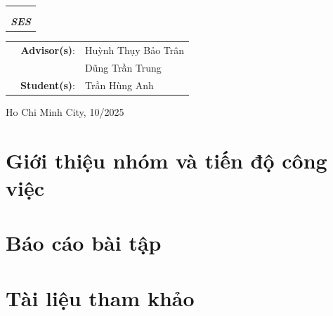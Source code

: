 \documentclass[a4paper]{article}
\begin{document}
\begin{titlepage}
\begin{center}
\begin{tabular}{c}
\textbf{\Large  }\\\\
\textbf{\Large \textit{\textbf{SES}}}
\\
\hline
\end{tabular}
\end{center}

\vspace{2cm}

\begin{table}[h]
\begin{tabular}{rrl}
\hspace{3.25 cm}

& \textbf{Advisor(s)}: &

Huỳnh Thụy Bảo Trân \\ & & Dũng Trần Trung
\\

& \textbf{Student(s)}: & Trần Hùng Anh

\newline
\end{tabular}
\end{table}

\vspace{2cm}
\begin{center}
{\footnotesize Ho Chi Minh City, 10/2025}
\end{center}
\end{titlepage}
\newpage
\thispagestyle{empty}
\tableofcontents
\newpage
\part{Giới thiệu nhóm và tiến độ công việc}
 
\newpage
\part{Báo cáo bài tập}

\newpage
\part{Tài liệu tham khảo}

\end{document}
